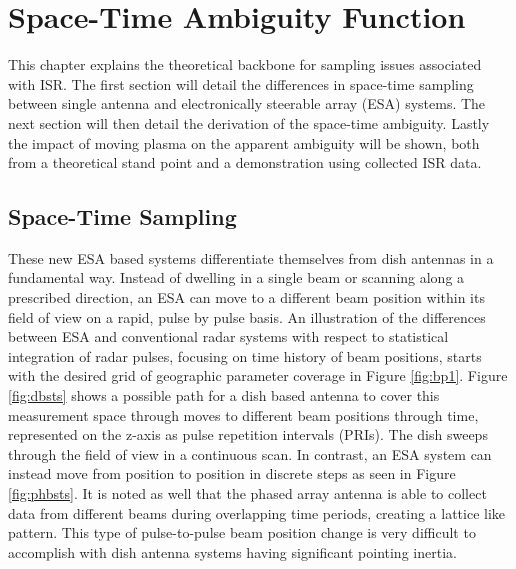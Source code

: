 \chapter{Space-Time Ambiguity Function}
\label{chapter:stamb}
\thispagestyle{myheadings}

\graphicspath{{3_STAmb/Figures/}}

This chapter explains the theoretical backbone for sampling issues associated with ISR. The first section will detail the differences in space-time sampling between single antenna and electronically steerable array (ESA) systems. The next section will then detail the derivation of the space-time ambiguity. Lastly the impact of moving plasma on the apparent ambiguity will be shown, both from a theoretical stand point and a demonstration using collected ISR data.


\section{Space-Time Sampling}
\label{sec:sptimesamp}
These new ESA based systems differentiate themselves from dish antennas in a fundamental way. Instead of dwelling in a single beam or scanning along a prescribed direction, an ESA can move to a different beam position within its field of view on a rapid, pulse by pulse basis. An illustration of the differences between ESA and conventional radar systems with respect to statistical integration of radar pulses, focusing on time history of beam positions, starts with the desired grid of geographic parameter coverage in Figure \ref{fig:bp1}. Figure \ref{fig:dbsts} shows a possible path for a dish based antenna to cover this measurement space through moves to different beam positions through time, represented on the z-axis as pulse repetition intervals (PRIs). The dish sweeps through the field of view in a continuous scan.  In contrast, an ESA system can instead move from position to position in discrete steps as seen in Figure \ref{fig:phbsts}. It is noted as well that the phased array antenna is able to collect data from different beams during overlapping time periods, creating a lattice like pattern. This type of pulse-to-pulse beam position change is very difficult to accomplish with dish antenna systems having significant pointing inertia. 

